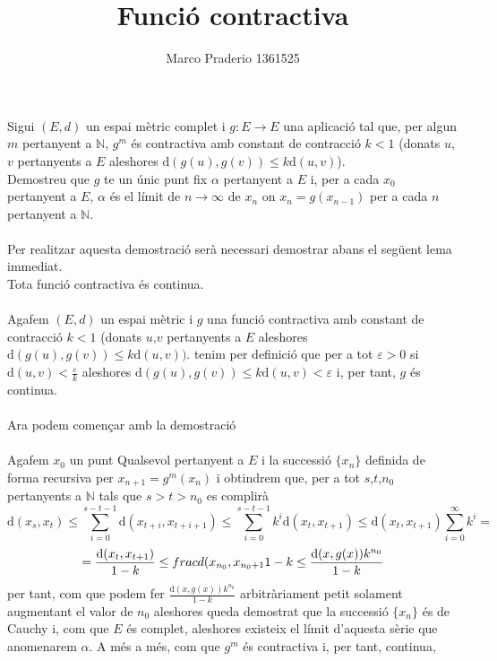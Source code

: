 \documentclass[a4paper,10pt]{article}
\title{Funció contractiva}
\author{Marco Praderio 1361525}
\date{}
\renewcommand{\*}{\cdot}
\newcommand{\N}{\mathbb{N}}
\renewcommand{\d}{\text{d}}
\renewcommand{\a}{\alpha}
\newcommand{\e}{\varepsilon}
\begin{document}
\maketitle
Sigui $(E,d)$ un espai mètric complet i $g: E\to E$  una aplicació tal que, per algun $m$ pertanyent a $\N$, $g^m$ és contractiva amb constant de contracció $k<1$ (donats
$u$,$v$ pertanyents a $E$ aleshores $\d(g(u),g(v))\le k\d(u,v)$).\\Demostreu que $g$ te un únic punt fix $\a$ pertanyent a $E$ i, per a cada $x_0$ pertanyent a $E$, 
$\a$ és el límit de $n\to\infty$ de $x_n$ on $x_n=g(x_{n-1})$ per a cada $n$ pertanyent a $\N$.\\
\phantom{.}\\
Per realitzar aquesta demostració serà necessari demostrar abans el següent lema immediat.\\
Tota funció contractiva és continua.\\
\phantom{.}\\
Agafem $(E,d)$ un espai mètric i $g$ una funció contractiva amb constant de contracció $k<1$ (donats $u$,$v$ pertanyents a $E$ aleshores $\d(g(u),g(v))\le k \d(u,v))$.
tenim per definició que per a tot $\e>0$ si $\d(u,v)<\frac{\e}{k}$ aleshores $\d(g(u),g(v))\le k\d(u,v)<\e$ i, per tant, $g$ és continua.\\
\phantom{.}\\
Ara podem començar amb la demostració\\
\phantom{.}\\
Agafem $x_0$ un punt Qualsevol pertanyent a $E$ i la successió $\{x_n\}$ definida de forma recursiva per $x_{n+1}=g^m(x_n)$ i obtindrem que,
per a tot $s$,$t$,$n_0$ pertanyents a $\N$ tals que $s>t>n_0$ es complirà
\begin{equation*}
\d(x_s,x_t)\le \sum_{i=0}^{s-t-1}\d(x_{t+i}, x_{t+i+1})\le\sum_{i=0}^{s-t-1}k^i\d(x_t, x_{t+1})\le\d(x_t, x_{t+1})\sum_{i=0}^{\infty}k^i=
\end{equation*}
\begin{equation*}
=\frac{\d(x_t, x_{t+1})}{1-k}\le\\frac{d(x_{n_0}, x_{n_0+1}}{1-k}\le\frac{\d(x,g(x))k^{n_0}}{1-k}
\end{equation*}
per tant, com que podem fer $\frac{\d(x,g(x))k^{n_0}}{1-k}$ arbitràriament petit solament augmentant el valor de $n_0$ aleshores queda demostrat que la successió $\{x_n\}$
és de Cauchy i, com que $E$ és complet, aleshores existeix el límit d'aquesta sèrie que anomenarem $\a$. A més a més, com que $g^m$ és contractiva i, per tant, continua,
\end{document}
